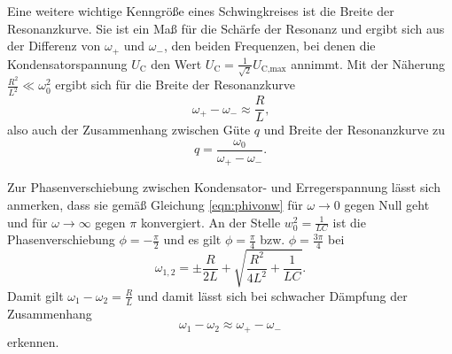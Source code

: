 Eine weitere wichtige Kenngröße eines Schwingkreises ist die Breite der Resonanzkurve.
Sie ist ein Maß für die Schärfe der Resonanz und ergibt sich aus der Differenz von
$\omega_+$ und $\omega_-$, den beiden Frequenzen, bei denen die Kondensatorspannung $U_{\text{C}}$ den Wert $U_{\text{C}} = \frac{1}{\sqrt{2}} U_{\text{C,max}}$ annimmt.
Mit der Näherung $\frac{R^2}{L^2} \ll \omega_0^2$ ergibt sich für die Breite der Resonanzkurve
\begin{equation}
	\label{eqn:breite}
	\omega_+ - \omega_- \approx \frac{R}{L} \text{,}
\end{equation}
also auch der Zusammenhang zwischen Güte $q$ und Breite der Resonanzkurve zu
\begin{equation}
	q = \frac{\omega_0}{\omega_+ - \omega_-} \text{.}
\end{equation}

Zur Phasenverschiebung zwischen Kondensator- und Erregerspannung lässt sich anmerken,
dass sie gemäß Gleichung \eqref{eqn:phivonw} für $\omega \to 0$ gegen Null geht und für
$\omega \to \infty$ gegen $\pi$ konvergiert.
An der Stelle $w_0^2 = \frac{1}{LC}$ ist die Phasenverschiebung $\phi = -\frac{\pi}{2}$ und es gilt $\phi = \frac{\pi}{4}$ bzw. $\phi = \frac{3\pi}{4}$ bei
\begin{equation}
	\label{eqn:omega12}
	\omega_{1,2} = \pm \frac{R}{2L} + \sqrt{\frac{R^2}{4L^2} + \frac{1}{LC}} \text{.}
\end{equation}
Damit gilt $\omega_1 - \omega_2 = \frac{R}{L}$ und damit lässt sich bei schwacher Dämpfung
der Zusammenhang
\begin{equation}
	\omega_1 - \omega_2 \approx \omega_+ - \omega_-
\end{equation}
erkennen.
